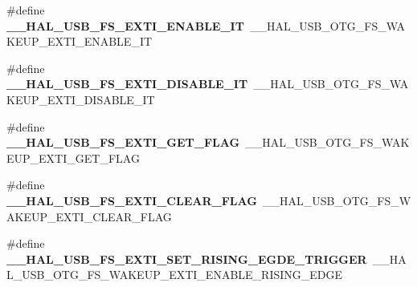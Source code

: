 \begin{DoxyCompactItemize}
\item 
\#define {\bfseries \+\_\+\+\_\+\+H\+A\+L\+\_\+\+U\+S\+B\+\_\+\+F\+S\+\_\+\+E\+X\+T\+I\+\_\+\+E\+N\+A\+B\+L\+E\+\_\+\+IT}~\+\_\+\+\_\+\+H\+A\+L\+\_\+\+U\+S\+B\+\_\+\+O\+T\+G\+\_\+\+F\+S\+\_\+\+W\+A\+K\+E\+U\+P\+\_\+\+E\+X\+T\+I\+\_\+\+E\+N\+A\+B\+L\+E\+\_\+\+IT\hypertarget{group___h_a_l___u_s_b___aliased___macros_ga31a23737a111962f4231725129dcebde}{}\label{group___h_a_l___u_s_b___aliased___macros_ga31a23737a111962f4231725129dcebde}

\item 
\#define {\bfseries \+\_\+\+\_\+\+H\+A\+L\+\_\+\+U\+S\+B\+\_\+\+F\+S\+\_\+\+E\+X\+T\+I\+\_\+\+D\+I\+S\+A\+B\+L\+E\+\_\+\+IT}~\+\_\+\+\_\+\+H\+A\+L\+\_\+\+U\+S\+B\+\_\+\+O\+T\+G\+\_\+\+F\+S\+\_\+\+W\+A\+K\+E\+U\+P\+\_\+\+E\+X\+T\+I\+\_\+\+D\+I\+S\+A\+B\+L\+E\+\_\+\+IT\hypertarget{group___h_a_l___u_s_b___aliased___macros_gac7f83957a48d47ee7f44742dd7e30ff3}{}\label{group___h_a_l___u_s_b___aliased___macros_gac7f83957a48d47ee7f44742dd7e30ff3}

\item 
\#define {\bfseries \+\_\+\+\_\+\+H\+A\+L\+\_\+\+U\+S\+B\+\_\+\+F\+S\+\_\+\+E\+X\+T\+I\+\_\+\+G\+E\+T\+\_\+\+F\+L\+AG}~\+\_\+\+\_\+\+H\+A\+L\+\_\+\+U\+S\+B\+\_\+\+O\+T\+G\+\_\+\+F\+S\+\_\+\+W\+A\+K\+E\+U\+P\+\_\+\+E\+X\+T\+I\+\_\+\+G\+E\+T\+\_\+\+F\+L\+AG\hypertarget{group___h_a_l___u_s_b___aliased___macros_gabf961284ea86d34de9e320e6f04fa8af}{}\label{group___h_a_l___u_s_b___aliased___macros_gabf961284ea86d34de9e320e6f04fa8af}

\item 
\#define {\bfseries \+\_\+\+\_\+\+H\+A\+L\+\_\+\+U\+S\+B\+\_\+\+F\+S\+\_\+\+E\+X\+T\+I\+\_\+\+C\+L\+E\+A\+R\+\_\+\+F\+L\+AG}~\+\_\+\+\_\+\+H\+A\+L\+\_\+\+U\+S\+B\+\_\+\+O\+T\+G\+\_\+\+F\+S\+\_\+\+W\+A\+K\+E\+U\+P\+\_\+\+E\+X\+T\+I\+\_\+\+C\+L\+E\+A\+R\+\_\+\+F\+L\+AG\hypertarget{group___h_a_l___u_s_b___aliased___macros_ga50dabd1d5a2ad8d58e598a9faf24d812}{}\label{group___h_a_l___u_s_b___aliased___macros_ga50dabd1d5a2ad8d58e598a9faf24d812}

\item 
\#define {\bfseries \+\_\+\+\_\+\+H\+A\+L\+\_\+\+U\+S\+B\+\_\+\+F\+S\+\_\+\+E\+X\+T\+I\+\_\+\+S\+E\+T\+\_\+\+R\+I\+S\+I\+N\+G\+\_\+\+E\+G\+D\+E\+\_\+\+T\+R\+I\+G\+G\+ER}~\+\_\+\+\_\+\+H\+A\+L\+\_\+\+U\+S\+B\+\_\+\+O\+T\+G\+\_\+\+F\+S\+\_\+\+W\+A\+K\+E\+U\+P\+\_\+\+E\+X\+T\+I\+\_\+\+E\+N\+A\+B\+L\+E\+\_\+\+R\+I\+S\+I\+N\+G\+\_\+\+E\+D\+GE\hypertarget{group___h_a_l___u_s_b___aliased___macros_ga0b77287493d393b314f03576b105134e}{}\label{group___h_a_l___u_s_b___aliased___macros_ga0b77287493d393b314f03576b105134e}


\end{DoxyCompactItemize}
